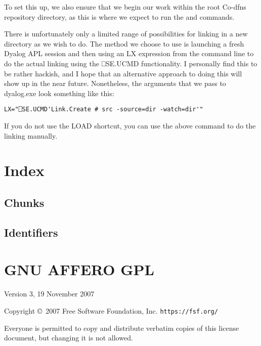 \documentclass{article}%
\begin{document}
To set this up, we also ensure that we begin our work within the
root Co-dfns repository directory, as this is where we expect to run
the {\Tt{}\nwendquote} and {\Tt{}\nwendquote} commands.

There is unfortunately only a limited range of possibilities for
linking in a new directory as we wish to do.
The method we choose to use is launching a fresh Dyalog APL session
and then using an {\Tt{}LX\nwendquote} expression from the command line
to do the actual linking using the {\Tt{}⎕SE.UCMD\nwendquote} functionality.
I personally find this to be rather hackish, and I hope that an
alternative approach to doing this will show up in the near future.
Nonetheless, the arguments that we pass to {\Tt{}dyalog.exe\nwendquote}
look something like this:

\begin{verbatim}
LX="⎕SE.UCMD'Link.Create # src -source=dir -watch=dir'"
\end{verbatim}

If you do not use the {\Tt{}LOAD\nwendquote} shortcut, you can use the above
command to do the linking manually.

\section{Index}

\subsection{Chunks}

\nowebchunks

\subsection{Identifiers}

\nowebindex

\clearpage
\section{GNU AFFERO GPL}

\begin{center}
{\parindent 0in

Version 3, 19 November 2007

Copyright \copyright\  2007 Free Software Foundation, Inc. \texttt{https://fsf.org/}

\bigskip
Everyone is permitted to copy and distribute verbatim copies of this
license document, but changing it is not allowed.}

\end{center}
\end{document}
